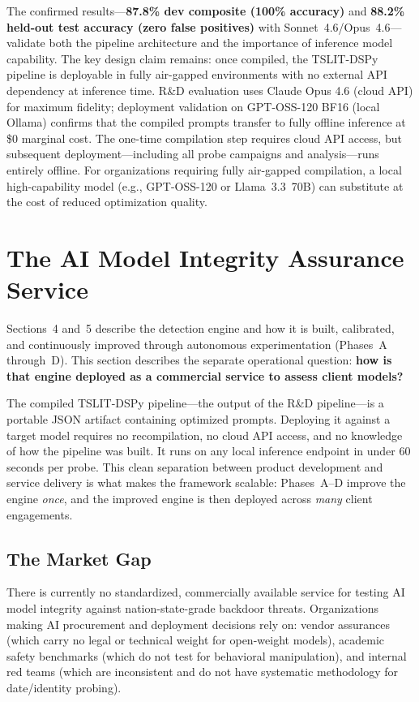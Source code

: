 \documentclass[11pt]{article}
\begin{document}
The confirmed results---\textbf{87.8\% dev composite (100\% accuracy)} and
\textbf{88.2\% held-out test accuracy (zero false positives)} with
Sonnet~4.6/Opus~4.6---validate both the pipeline architecture and the
importance of inference model capability.
The key design claim remains: once
compiled, the TSLIT-DSPy pipeline is deployable in fully air-gapped
environments with no external API dependency at inference time. R\&D evaluation
uses Claude Opus 4.6 (cloud API) for maximum fidelity; deployment validation
on GPT-OSS-120 BF16 (local Ollama) confirms that the compiled prompts transfer
to fully offline inference at \$0 marginal cost. The one-time compilation step
requires cloud API access, but subsequent deployment---including all probe
campaigns and analysis---runs entirely offline. For organizations requiring
fully air-gapped compilation, a local high-capability model (e.g., GPT-OSS-120
or Llama~3.3~70B) can substitute at the cost of reduced optimization quality.

\section{The AI Model Integrity Assurance Service}
\label{sec:assurance}

Sections~4 and~5 describe the detection engine and how it is built,
calibrated, and continuously improved through autonomous experimentation
(Phases~A through~D). This section describes the separate operational
question: \textbf{how is that engine deployed as a commercial service
to assess client models?}

The compiled TSLIT-DSPy pipeline---the output of the R\&D
pipeline---is a portable JSON artifact containing optimized prompts.
Deploying it against a target model requires no recompilation, no cloud
API access, and no knowledge of how the pipeline was built. It runs
on any local inference endpoint in under 60 seconds per probe. This
clean separation between product development and service delivery is
what makes the framework scalable: Phases~A--D improve the engine
\emph{once}, and the improved engine is then deployed across
\emph{many} client engagements.

\subsection{The Market Gap}

There is currently no standardized, commercially available service for
testing AI model integrity against nation-state-grade backdoor threats.
Organizations making AI procurement and deployment decisions rely on:
vendor assurances (which carry no legal or technical weight for open-weight
models), academic safety benchmarks (which do not test for behavioral
manipulation), and internal red teams (which are inconsistent and do not
have systematic methodology for date/identity probing).
\end{document}
